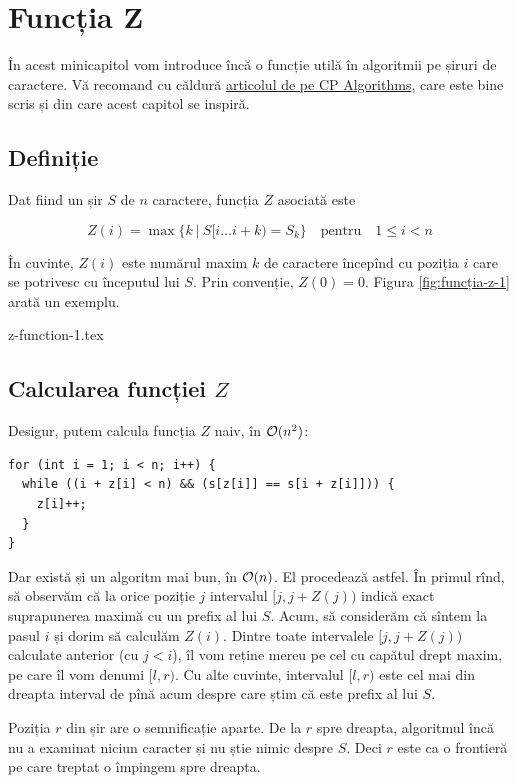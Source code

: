\documentclass[../main.tex]{subfiles}
\begin{document}
\chapter{Funcția Z}

În acest minicapitol vom introduce încă o funcție utilă în algoritmii pe șiruri de caractere. Vă recomand cu căldură \href{https://cp-algorithms.com/string/z-function.html}{articolul de pe CP Algorithms}, care este bine scris și din care acest capitol se inspiră.


\section{Definiție}

Dat fiind un șir $S$ de $n$ caractere, funcția $Z$ asociată este

$$Z(i) = \max \{ k\ |\ S[i \dots i+k) = S_k \} \quad \textrm{pentru} \quad 1 \leq i < n$$

În cuvinte, $Z(i)$ este numărul maxim $k$ de caractere începînd cu poziția $i$ care se potrivesc cu începutul lui $S$. Prin convenție, $Z(0) = 0$. Figura \ref{fig:funcția-z-1} arată un exemplu.

{z-function-1.tex}


\section{Calcularea funcției \texorpdfstring{$Z$}{Z}}

Desigur, putem calcula funcția $Z$ naiv, în $\mathcal{O}(n^2)$:

\begin{verbatim}
for (int i = 1; i < n; i++) {
  while ((i + z[i] < n) && (s[z[i]] == s[i + z[i]])) {
    z[i]++;
  }
}
\end{verbatim}

Dar există și un algoritm mai bun, în $\mathcal{O}(n)$. El procedează astfel. În primul rînd, să observăm că la orice poziție $j$ intervalul $[j, j + Z(j))$ indică exact suprapunerea maximă cu un prefix al lui $S$. Acum, să considerăm că sîntem la pasul $i$ și dorim să calculăm $Z(i)$. Dintre toate intervalele $[j, j + Z(j))$ calculate anterior (cu $j < i$), îl vom reține mereu pe cel cu capătul drept maxim, pe care îl vom denumi $[l, r)$. Cu alte cuvinte, intervalul $[l, r)$ este cel mai din dreapta interval de pînă acum despre care știm că este prefix al lui $S$.

Poziția $r$ din șir are o semnificație aparte. De la $r$ spre dreapta, algoritmul încă nu a examinat niciun caracter și nu știe nimic despre $S$. Deci $r$ este ca o frontieră pe care treptat o împingem spre dreapta.
\end{document}
